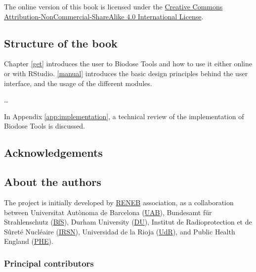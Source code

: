 \documentclass[]{scrartcl}
\begin{document}
The online version of this book is licensed under the \href{http://creativecommons.org/licenses/by-nc-sa/4.0/}{Creative Commons Attribution-NonCommercial-ShareAlike 4.0 International License}.

\hypertarget{structure-of-the-book}{%
\subsection*{Structure of the book}\label{structure-of-the-book}}

Chapter \ref{get} introduces the user to Biodose Tools and how to use it either online or with RStudio. \ref{manual} introduces the basic design principles behind the user interface, and the usage of the different modules.

\ldots{}

In Appendix \ref{app:implementation}, a technical review of the implementation of Biodose Tools is discussed.

\hypertarget{acknowledgements}{%
\subsection*{Acknowledgements}\label{acknowledgements}}

\hypertarget{about-the-authors}{%
\subsection*{About the authors}\label{about-the-authors}}

The project is initially developed by \href{http://www.reneb.net}{RENEB} association, as a collaboration between Universitat Autònoma de Barcelona (\href{https://www.uab.cat/}{UAB}), Bundesamt für Strahlenschutz (\href{http://www.bfs.de/EN/home/home_node.html}{BfS}), Durham University (\href{https://www.dur.ac.uk/}{DU}), Institut de Radioprotection et de Sûreté Nucléaire (\href{https://www.irsn.fr/EN/Pages/Home.aspx}{IRSN}), Universidad de la Rioja (\href{https://www.unirioja.es/}{UdR}), and Public Health England (\href{https://www.phe-protectionservices.org.uk/}{PHE}).

\hypertarget{principal-contributors}{%
\subsubsection*{Principal contributors}\label{principal-contributors}}
\end{document}
